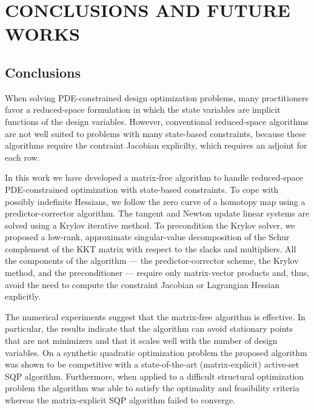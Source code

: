  
\chapter{CONCLUSIONS AND FUTURE WORKS}

\section{Conclusions}
When solving PDE-constrained design optimization problems, many practitioners
favor a reduced-space formulation in which the state variables are implicit
functions of the design variables.  However, conventional reduced-space
algorithms are not well suited to problems with many state-based constraints,
because these algorithms require the contraint Jacobian explicilty, which
requires an adjoint for each row.

In this work we have developed a matrix-free algorithm to handle reduced-space
PDE-constrained optimization with state-based constraints.  To cope with
possibly indefinite Hessians, we follow the zero curve of a homotopy map using a
predictor-corrector algorithm.  The tangent and Newton update linear systems are
solved using a Krylov iterative method.  To precondition the Krylov solver, we
proposed a low-rank, approximate singular-value decomposition of the Schur
complement of the KKT matrix with respect to the slacks and multipliers.  All
the components of the algorithm --- the predictor-corrector scheme, the Krylov
method, and the preconditioner --- require only matrix-vector products and,
thus, avoid the need to compute the constraint Jacobian or Lagrangian Hessian
explicitly.

The numerical experiments suggest that the matrix-free algorithm is effective.
In particular, the results indicate that the algorithm can avoid stationary
points that are not minimizers and that it scales well with the number of design
variables.  On a synthetic quadratic optimization problem the proposed algorithm
was shown to be competitive with a state-of-the-art (matrix-explicit) active-set
SQP algorithm.  Furthermore, when applied to a difficult structural optimization
problem the algorithm was able to satisfy the optimality and feasibility
criteria whereas the matrix-explicit SQP algorithm failed to converge. 


